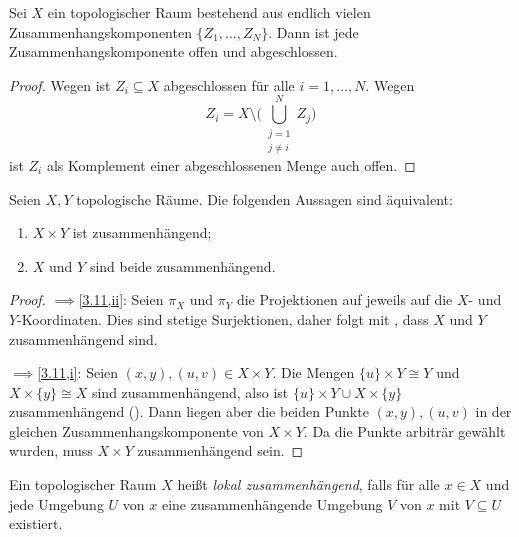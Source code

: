 \documentclass[
12pt, 
openany, 
a4paper, 
final,
fleqn, 
]{myclass}
\numberwithin{equation}{chapter}
\numberwithin{section}{chapter}
\newcommand{\union}{\bigcup}
\newcommand{\implication}[2]{\glqq {#1}$\implies${#2}\grqq}
\newcommand{\TFAE}{Die folgenden Aussagen sind äquivalent}
\begin{document}
\begin{cor}\label{3.10}
Sei $X$ ein topologischer Raum bestehend aus endlich vielen Zusammenhangskomponenten $\{Z_1, \dots, Z_N\}$. Dann ist jede Zusammenhangskomponente offen und abgeschlossen.
\end{cor}
\begin{proof}
Wegen  ist $Z_i\subseteq X$ abgeschlossen für alle $i=1,\dots, N$. Wegen 
\[
Z_i = X \setminus \bigg(\union_{\substack{j=1\\j\neq i}}^N Z_j\bigg)
\]
ist $Z_i$ als Komplement einer abgeschlossenen Menge auch offen.
\end{proof}
\begin{cor}\label{3.11}
Seien $X, Y$ topologische Räume. {\TFAE}: 
\begin{enumerate}[label=\textit{(\roman*)}]
\item\label{3.11,i} $X\times Y$ ist zusammenhängend; 
\item\label{3.11,ii} $X$ und $Y$ sind beide zusammenhängend. 
\end{enumerate}
\end{cor}
\begin{proof}
\implication{\ref{3.11,i}}{\ref{3.11,ii}}: Seien $ \pi_{X} $ und $ \pi_{Y} $ die Projektionen auf jeweils auf die $X$- und $Y$-Koordinaten. Dies sind stetige Surjektionen, daher folgt mit , dass $ X $ und $ Y$ zusammenhängend sind. 

\implication{\ref{3.11,ii}}{\ref{3.11,i}}: Seien $(x, y), (u, v)\in X\times Y$. Die Mengen $ \{u\}\times Y \cong Y $ und $ X\times \{y\} \cong X $ sind zusammenhängend, also ist $ \{u\}\times Y \cup X \times \{y\} $ zusammenhängend (). Dann liegen aber die beiden Punkte $(x, y), (u, v)$ in der gleichen Zusammenhangskomponente von $ X\times Y $. Da die Punkte arbiträr gewählt wurden, muss $X\times Y$ zusammenhängend sein. 
\end{proof}
\begin{defn}\label{3.12}
Ein topologischer Raum $X$ heißt \emph{lokal zusammenhängend}, falls für alle $x\in X$ und jede Umgebung $U$ von $x$ eine zusammenhängende Umgebung $V$ von $x$ mit $V\subseteq U$ existiert. 
\end{defn}
\end{document}
